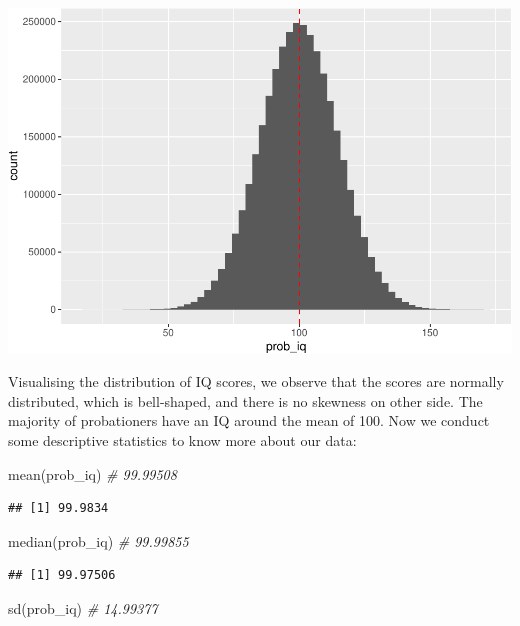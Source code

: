 \documentclass[
]{book}
\newenvironment{Shaded}{\begin{snugshade}}{\end{snugshade}}
\newcommand{\CommentTok}[1]{\textcolor[rgb]{0.56,0.35,0.01}{\textit{#1}}}
\newcommand{\FunctionTok}[1]{\textcolor[rgb]{0.00,0.00,0.00}{#1}}
\newcommand{\NormalTok}[1]{#1}
\begin{document}
\includegraphics{05-inferential-statistics_files/figure-latex/unnamed-chunk-3-1.pdf}

Visualising the distribution of IQ scores, we observe that the scores are normally distributed, which is bell-shaped, and there is no skewness on other side. The majority of probationers have an IQ around the mean of 100. Now we conduct some descriptive statistics to know more about our data:

\begin{Shaded}
\begin{Highlighting}[]
\FunctionTok{mean}\NormalTok{(prob\_iq) }\CommentTok{\# 99.99508}
\end{Highlighting}
\end{Shaded}

\begin{verbatim}
## [1] 99.9834
\end{verbatim}

\begin{Shaded}
\begin{Highlighting}[]
\FunctionTok{median}\NormalTok{(prob\_iq) }\CommentTok{\# 99.99855}
\end{Highlighting}
\end{Shaded}

\begin{verbatim}
## [1] 99.97506
\end{verbatim}

\begin{Shaded}
\begin{Highlighting}[]
\FunctionTok{sd}\NormalTok{(prob\_iq) }\CommentTok{\# 14.99377}
\end{Highlighting}
\end{Shaded}
\end{document}
